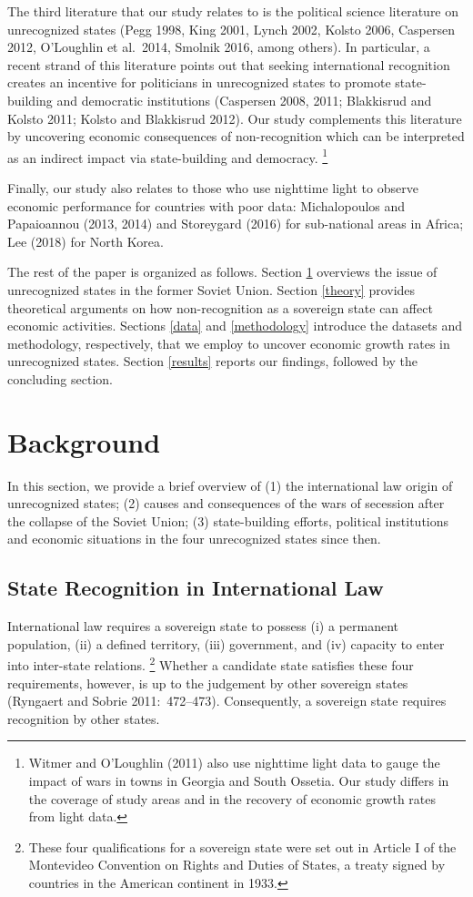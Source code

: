 \documentclass[12pt,a4paper]{article}%
\begin{document}
The third literature that our study relates to is the political science literature on unrecognized states (Pegg 1998, King 2001, Lynch 2002, Kolsto 2006, Caspersen 2012, O'Loughlin et al.\ 2014, Smolnik 2016, among others). 
In particular, a recent strand of this literature points out that seeking international recognition creates an incentive for politicians in unrecognized states to promote state-building and democratic institutions (Caspersen 2008, 2011; Blakkisrud and Kolsto 2011; Kolsto and Blakkisrud 2012).
Our study complements this literature by uncovering economic consequences of non-recognition which can be interpreted as an indirect impact via state-building and democracy.%
\footnote{
	Witmer and O'Loughlin (2011) also use nighttime light data to gauge the impact of wars in towns in Georgia and South Ossetia. Our study differs in the coverage of study areas and in the recovery of economic growth rates from light data. 
} 

Finally, our study also relates to those who use nighttime light to observe economic performance for countries with poor data: Michalopoulos and Papaioannou (2013, 2014) and Storeygard (2016) for sub-national areas in Africa; Lee (2018) for North Korea. 

The rest of the paper is organized as follows. Section \ref{background} overviews the issue of unrecognized states in the former Soviet Union. Section \ref{theory} provides theoretical arguments on how non-recognition as a sovereign state can affect economic activities. Sections \ref{data} and \ref{methodology} introduce the datasets and methodology, respectively, that we employ to uncover economic growth rates in unrecognized states. Section \ref{results} reports our findings, followed by the concluding section.

\section{Background}\label{background}
In this section, we provide a brief overview of (1) the international law origin of unrecognized states; (2) causes and consequences of the wars of secession after the collapse of the Soviet Union; (3) state-building efforts, political institutions and economic situations in the four unrecognized states since then.
\subsection{State Recognition in International Law}\label{intl_law}
International law requires a sovereign state to possess (i) a permanent population, (ii) a defined territory, (iii) government, and (iv) capacity to enter into inter-state relations.%
\footnote{
	These four qualifications for a sovereign state were set out in Article I of the Montevideo Convention on Rights and Duties of States, a treaty signed by countries in the American continent in 1933.
	}
Whether a candidate state satisfies these four requirements, however, is up to the judgement by other sovereign states (Ryngaert and Sobrie 2011:\ 472--473).
Consequently, a sovereign state requires recognition by other states.
  
\end{document}
